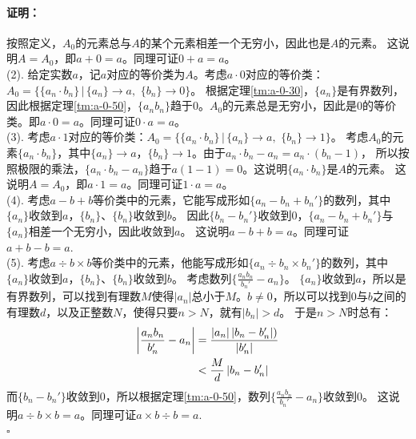 \documentclass[12pt,UTF8]{ctexbook}
\renewenvironment{proof}{\paragraph{\textbf{证明：}}}{\hfill$\square$}
\begin{document}
\begin{appendix}
\begin{proof}
    按照定义，$A_0$的元素总与$A$的某个元素相差一个无穷小，因此也是$A$的元素。
    这说明$A = A_0$，即$a + 0 = a$。同理可证$0+a=a$。\\
    (2). 给定实数$a$，记$a$对应的等价类为$A$。考虑$a\cdot 0$对应的等价类：$A_0 = \{ \{a_n \cdot b_n\} \,|\, \{a_n\}\to a, \,\, \{b_n\} \to 0 \}$。
    根据定理\ref{tm:a-0-30}，$\{a_n\}$是有界数列，因此根据定理\ref{tm:a-0-50}，$\{a_nb_n\}$趋于$0$。$A_0$的元素总是无穷小，因此是$0$的等价类。即$a \cdot 0 = a$。同理可证$0\cdot a=a$。\\
    (3). 考虑$a\cdot 1$对应的等价类：$A_0 = \{\{a_n \cdot b_n\} \,|\, \{a_n\}\to a, \,\, \{b_n\} \to 1 \}$。
    考虑$A_0$的元素$\{a_n \cdot b_n\}$，其中$\{a_n\}\to a$，$\{b_n\} \to 1$。由于$a_n \cdot b_n - a_n = a_n \cdot (b_n - 1)$，
    所以按照极限的乘法，$\{a_n \cdot b_n - a_n\}$趋于$a(1 - 1) = 0$。这说明$\{a_n \cdot b_n\}$是$A$的元素。
    这说明$A = A_0$，即$a \cdot 1 = a$。同理可证$1 \cdot a = a$。\\
    (4). 考虑$a - b + b$等价类中的元素，它能写成形如$\{a_n - b_n + b_n'\}$的数列，其中$\{a_n\}$收敛到$a$，$\{b_n\}$、$\{b_n\}$收敛到$b$。
    因此$\{b_n - b_n'\}$收敛到$0$，$\{a_n - b_n + b_n'\}$与$\{a_n\}$相差一个无穷小，因此收敛到$a$。
    这说明$a - b + b = a$。同理可证$a + b - b = a.$\\
    (5). 考虑$a \div b \times b$等价类中的元素，他能写成形如$\{a_n \div b_n \times b_n'\}$的数列，其中$\{a_n\}$收敛到$a$，$\{b_n\}$、$\{b_n\}$收敛到$b$。
    考虑数列$\{\frac{a_n b_n}{b_n'} - a_n\}$。
    $\{a_n\}$收敛到$a$，所以是有界数列，可以找到有理数$M$使得$|a_n|$总小于$M$。$b\neq 0$，所以可以找到$0$与$b$之间的有理数$d$，以及正整数$N$，使得只要$n>N$，就有$|b_n| > d$。
    于是$n>N$时总有：
    \begin{align}
        \left|\frac{a_n b_n}{b_n'} - a_n\right| &= \frac{\left|a_n\right| \left|b_n - b_n'\right|)}{\left|b_n'\right|} \notag \\
        &< \frac{M}{d}\left|b_n - b_n'\right| \notag
    \end{align}
    而$\{b_n - b_n'\}$收敛到$0$，所以根据定理\ref{tm:a-0-50}，数列$\{\frac{a_n b_n}{b_n'} - a_n\}$收敛到$0$。
    这说明$a \div b \times b = a$。同理可证$a\times b \div b = a.$\\
\end{proof}


\end{appendix}
\end{document}
